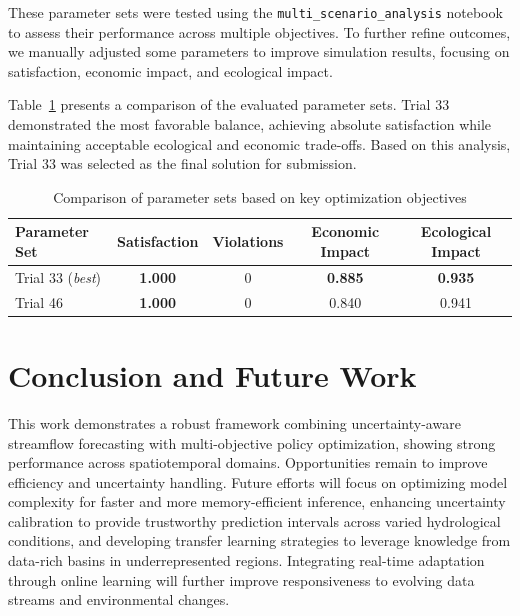 \documentclass[ruler]{CUP-JNL-EDS}%
\begin{document}
These parameter sets were tested using the \texttt{multi\_scenario\_analysis} notebook to assess their performance across multiple objectives. To further refine outcomes, we manually adjusted some parameters to improve simulation results, focusing on satisfaction, economic impact, and ecological impact.

Table~\ref{tab:manual_vs_optimized} presents a comparison of the evaluated parameter sets. Trial 33 demonstrated the most favorable balance, achieving absolute satisfaction while maintaining acceptable ecological and economic trade-offs. Based on this analysis, Trial 33 was selected as the final solution for submission.

\begin{table}[h]
    \centering
    \begin{tabular}{l|c|c|c|c}
        \textbf{Parameter Set} & \textbf{Satisfaction} & \textbf{Violations} & \textbf{Economic Impact} & \textbf{Ecological Impact} \\ \hline
        Trial 33 (\textit{best})           & \textbf{1.000 }  & 0              & \textbf{0.885}                   & \textbf{0.935 }                    \\
        Trial 46                           & \textbf{1.000}   & 0              & 0.840                             & 0.941                     \\
    \end{tabular}
    \caption{Comparison of parameter sets based on key optimization objectives}
    \label{tab:manual_vs_optimized}
\end{table}

\section{Conclusion and Future Work}
This work demonstrates a robust framework combining uncertainty-aware streamflow forecasting 
with multi-objective policy optimization, showing strong performance across spatiotemporal 
domains. Opportunities remain to improve efficiency and uncertainty handling. Future efforts 
will focus on optimizing model complexity for faster and more memory-efficient inference, 
enhancing uncertainty calibration to provide trustworthy prediction intervals across varied 
hydrological conditions, and developing transfer learning strategies to leverage knowledge 
from data-rich basins in underrepresented regions. Integrating real-time adaptation through 
online learning will further improve responsiveness to evolving data streams and environmental 
changes.\\
\end{document}
